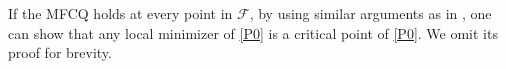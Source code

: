 \documentclass[10pt]{article}
\numberwithin{equation}{section}
\def\R{{\rm I\!R}}
\begin{document}
If the MFCQ holds at every point in $\mathcal{F}$, by using similar arguments as in \cite[Section~2]{YuLP20}, one can show that any local minimizer of \eqref{P0} is a {\color{blue}critical point} of \eqref{P0}. We omit its proof for brevity.
\end{document}
